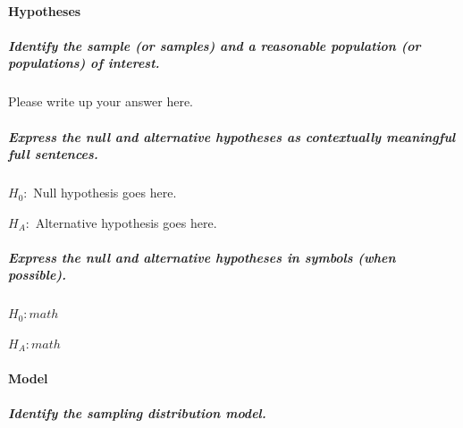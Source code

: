 \documentclass[
]{book}
\begin{document}
\hypertarget{hypotheses-1}{%
\paragraph*{Hypotheses}\label{hypotheses-1}}

\hypertarget{identify-the-sample-or-samples-and-a-reasonable-population-or-populations-of-interest.-1}{%
\subparagraph*{Identify the sample (or samples) and a reasonable population (or populations) of interest.}\label{identify-the-sample-or-samples-and-a-reasonable-population-or-populations-of-interest.-1}}

Please write up your answer here.

\hypertarget{express-the-null-and-alternative-hypotheses-as-contextually-meaningful-full-sentences.-1}{%
\subparagraph*{Express the null and alternative hypotheses as contextually meaningful full sentences.}\label{express-the-null-and-alternative-hypotheses-as-contextually-meaningful-full-sentences.-1}}

\(H_{0}:\) Null hypothesis goes here.

\(H_{A}:\) Alternative hypothesis goes here.

\hypertarget{express-the-null-and-alternative-hypotheses-in-symbols-when-possible.-1}{%
\subparagraph*{Express the null and alternative hypotheses in symbols (when possible).}\label{express-the-null-and-alternative-hypotheses-in-symbols-when-possible.-1}}

\(H_{0}: math\)

\(H_{A}: math\)

\hypertarget{model-1}{%
\paragraph*{Model}\label{model-1}}

\hypertarget{identify-the-sampling-distribution-model.-1}{%
\subparagraph*{Identify the sampling distribution model.}\label{identify-the-sampling-distribution-model.-1}}
\end{document}

